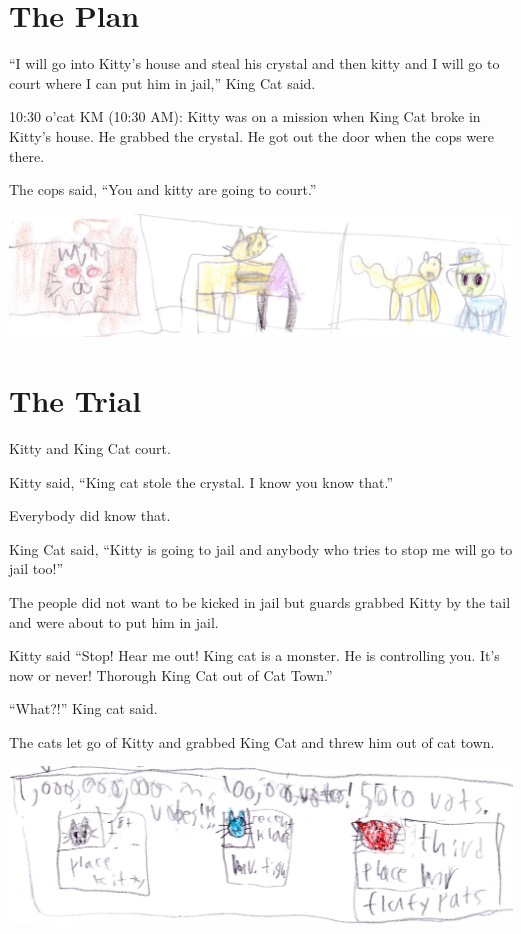 \documentclass[12pt,oneside]{krantz}
\begin{document}
\hypertarget{the-plan}{%
\chapter{The Plan}\label{the-plan}}

``I will go into Kitty's house and steal his crystal and then kitty and
I will go to court where I can put him in jail,'' King Cat said.

10:30 o'cat KM (10:30 AM): Kitty was on a mission when King Cat broke in
Kitty's house. He grabbed the crystal. He got out the door when the cops
were there.

The cops said, ``You and kitty are going to court.''

\includegraphics{img/cattriangle.jpg}

\hypertarget{the-trial}{%
\chapter{The Trial}\label{the-trial}}

Kitty and King Cat court.

Kitty said, ``King cat stole the crystal. I know you know that.''

Everybody did know that.

King Cat said, ``Kitty is going to jail and anybody who tries to stop me
will go to jail too!''

The people did not want to be kicked in jail but guards grabbed Kitty by
the tail and were about to put him in jail.

Kitty said ``Stop! Hear me out! King cat is a monster. He is controlling
you. It's now or never! Thorough King Cat out of Cat Town.''

``What?!'' King cat said.

The cats let go of Kitty and grabbed King Cat and threw him out of cat
town.

\includegraphics{img/thirdplace.jpg}
\end{document}
